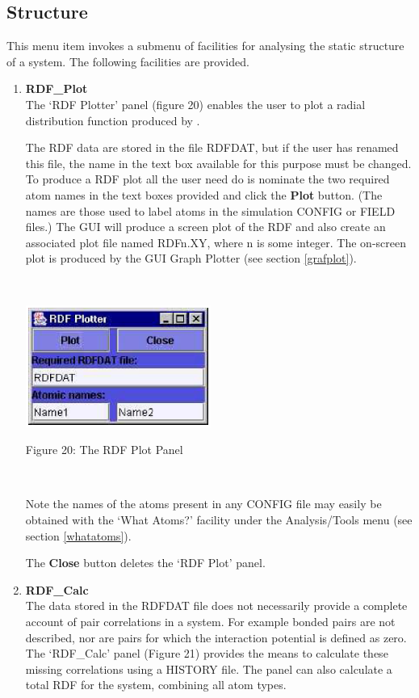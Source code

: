 \subsection{Structure}
This menu item invokes a submenu of facilities for analysing the static
structure of a system. The following facilities are provided.
\begin{enumerate}
\item {\bf RDF\_Plot}\\
The `RDF Plotter' panel (figure 20) enables the user to plot a radial
distribution function produced by \DD{}. \label{rdfplot}

The RDF data are stored in the file RDFDAT, but if the user has
renamed this file, the name in the text box available for this purpose
must be changed. To produce a RDF plot all the user need do is nominate
the two required atom names in the text boxes provided and click the
{\bf Plot} button. (The names are those used to label atoms in the
simulation CONFIG or FIELD files.)  The GUI will produce a screen plot
of the RDF and also create an associated plot file named RDFn.XY,
where n is some integer. The on-screen plot is produced
by the GUI Graph Plotter (see section \ref{grafplot}).

~

\vskip 5mm
\centerline{\includegraphics[height=4cm]{rdfplot.ps}}
\centerline{Figure 20: The RDF Plot Panel}
\vskip 5mm

~

\noindent
Note the names of the atoms present in any CONFIG file may easily be
obtained with the `What Atoms?' facility under the Analysis/Tools menu
(see section \ref{whatatoms}).

The {\bf Close} button deletes the `RDF Plot' panel.

\item {\bf RDF\_Calc}\\
The data stored in the RDFDAT file does not necessarily provide a
complete account of pair correlations in a system. For example bonded
pairs are not described, nor are pairs for which the interaction
potential is defined as zero. The `RDF\_Calc' panel (Figure 21)
provides the means to calculate these missing correlations using a \DD{}
HISTORY file. The panel can also calculate a total RDF for the system,
combining all atom types.


\end{enumerate}

